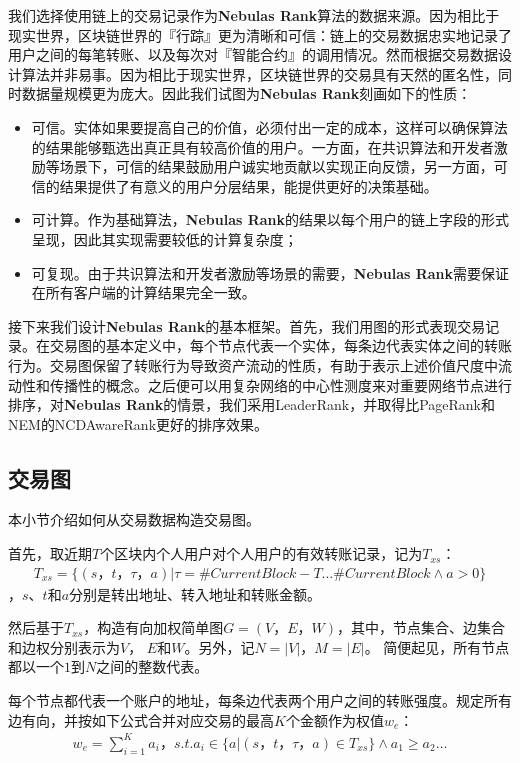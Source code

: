 我们选择使用链上的交易记录作为\textbf{Nebulas Rank}算法的数据来源。因为相比于现实世界，区块链世界的『行踪』更为清晰和可信：链上的交易数据忠实地记录了用户之间的每笔转账、以及每次对『智能合约』的调用情况。然而根据交易数据设计算法并非易事。因为相比于现实世界，区块链世界的交易具有天然的匿名性，同时数据量规模更为庞大。因此我们试图为\textbf{Nebulas Rank}刻画如下的性质：
\begin{itemize}
	\item 可信。实体如果要提高自己的价值，必须付出一定的成本，这样可以确保算法的结果能够甄选出真正具有较高价值的用户。一方面，在共识算法和开发者激励等场景下，可信的结果鼓励用户诚实地贡献以实现正向反馈，另一方面，可信的结果提供了有意义的用户分层结果，能提供更好的决策基础。
	\item 可计算。作为基础算法，\textbf{Nebulas Rank}的结果以每个用户的链上字段的形式呈现，因此其实现需要较低的计算复杂度；
	\item 可复现。由于共识算法和开发者激励等场景的需要，\textbf{Nebulas Rank}需要保证在所有客户端的计算结果完全一致。
\end{itemize}

接下来我们设计\textbf{Nebulas Rank}的基本框架。首先，我们用图的形式表现交易记录。在交易图的基本定义中，每个节点代表一个实体，每条边代表实体之间的转账行为\cite{Tschorsch2015}。交易图保留了转账行为导致资产流动的性质，有助于表示上述价值尺度中流动性和传播性的概念。之后便可以用复杂网络的中心性测度来对重要网络节点进行排序，对\textbf{Nebulas Rank}的情景，我们采用LeaderRank\cite{Chen2013}\cite{Li2014}，并取得比PageRank和NEM\cite{nem}的NCDAwareRank更好的排序效果。

\subsection{交易图} \label{subsec:txg}
本小节介绍如何从交易数据构造交易图。

首先，取近期$T$个区块内个人用户对个人用户的有效转账记录，记为$T_{xs}$：
\begin{align}
T_{xs} = \{(s，t，\tau， a)| \tau = \#CurrentBlock-T \dots \#CurrentBlock \land a > 0 \}
\end{align}
，$s$、$t$和$a$分别是转出地址、转入地址和转账金额。

然后基于$T_{xs}$，构造有向加权简单图$G=(V， E， W)$，其中，节点集合、边集合和边权分别表示为$V$， $E$和$W$。另外，记$N = |V|$，$M = |E|$。 简便起见，所有节点都以一个$1$到$N$之间的整数代表。

每个节点都代表一个账户的地址，每条边代表两个用户之间的转账强度。规定所有边有向，并按如下公式合并对应交易的最高$K$个金额作为权值$w_e$：
\begin{align}\label{formula:edgeweight}
w_e = \sum_{i=1}^K a_i， s.t. a_i \in \{a|(s，t，\tau，a) \in T_{xs} \} \land a_1 \geq a_2 \dots
\end{align}

